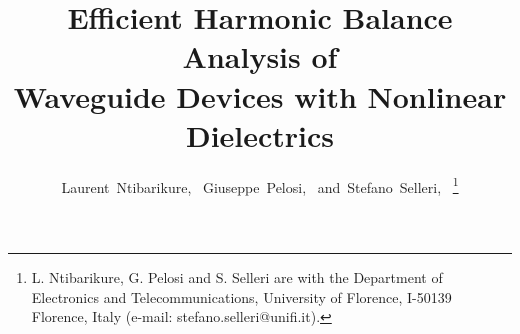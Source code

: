 \documentclass[journal]{IEEEtran}
\begin{document}

%
\title{Efficient Harmonic Balance Analysis of \\ Waveguide Devices with Nonlinear Dielectrics}
%
%
%
\author{ Laurent~Ntibarikure,~
		Giuseppe~Pelosi,~
        and~Stefano~Selleri,~
        \thanks{ L. Ntibarikure, G. Pelosi and S. Selleri are with the
        Department of Electronics and Telecommunications, University of 
        Florence, I-50139 Florence, Italy (e-mail: stefano.selleri@unifi.it).}
	  }
 

% 
%
\end{document}
